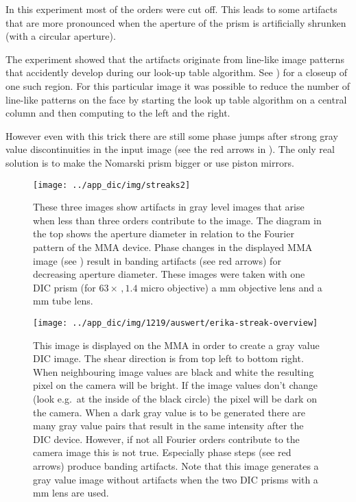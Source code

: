 In this experiment most of the orders were cut off. This leads to some
artifacts that are more pronounced when the aperture of the prism is
artificially shrunken (with a circular aperture).

The experiment showed that the artifacts originate from line-like
image patterns that accidently develop during our look-up table
algorithm. See ) for a closeup of
one such region.  For this particular image it was possible to reduce
the number of line-like patterns on the face by starting the look up
table algorithm on a central column and then computing to the left and
the right.

However even with this trick there are still some phase jumps after
strong gray value discontinuities in the input image (see the red
arrows in ). The only real solution
is to make the Nomarski prism bigger or use piston mirrors.

\begin{figure}[htb]
  \centering
  \texttt{[image: ../app\_dic/img/streaks2]}
  \caption{These three images show artifacts in gray level images that
    arise when less than three orders contribute to the image. The
    diagram in the top shows the aperture diameter in relation to the
    Fourier pattern of the MMA device. Phase changes in the displayed
    MMA image (see ) result in
    banding artifacts (see red arrows) for decreasing aperture
    diameter. These images were taken with one DIC prism (for
    $63\times\,,1.4$ micro objective) a \unit[200]{mm} objective lens
    and a \unit[500]{mm} tube lens.}
  \label{fig:erikas}
\end{figure}

\begin{figure}[p]
  \centering
  \texttt{[image: ../app\_dic/img/1219/auswert/erika-streak-overview]}
  \caption{This image is displayed on the MMA in order to create a
    gray value DIC image. The shear direction is from top left to
    bottom right. When neighbouring image values are black and white
    the resulting pixel on the camera will be bright. If the image
    values don't change (look e.g.\ at the inside of the black circle)
    the pixel will be dark on the camera. When a dark gray value is to
    be generated there are many gray value pairs that result in the
    same intensity after the DIC device. However, if not all Fourier
    orders contribute to the camera image this is not true. Especially
    phase steps (see red arrows) produce banding artifacts. Note that
    this image generates a gray value image without artifacts when the
    two DIC prisms with a \unit[100]{mm} lens are used.}
  \label{fig:erika-streak-overview}
\end{figure}

